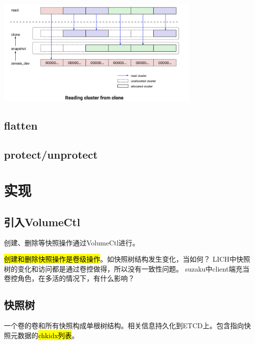 \begin{center}
\includegraphics[width=10cm]{../imgs/clone-read.png}
\end{center}

\subsection{flatten}

\subsection{protect/unprotect}

\section{实现}

\subsection{引入VolumeCtl}

创建、删除等快照操作通过VolumeCtl进行。

\hl{创建和删除快照操作是卷级操作}。如快照树结构发生变化，当如何？
LICH中快照树的变化和访问都是通过卷控做得，所以没有一致性问题。
suzaku中client端充当卷控角色，在多活的情况下，有什么影响？


\subsection{快照树}

一个卷的卷和所有快照构成单根树结构。相关信息持久化到ETCD上。包含指向快照元数据的\hl{chkidx列表}。



